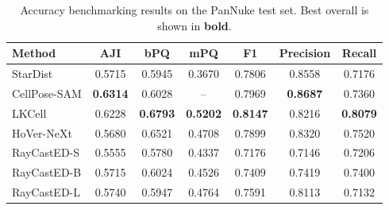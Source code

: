 \begin{table}[H]
	\centering
	\caption{Accuracy benchmarking results on the PanNuke test set. Best overall is shown in \textbf{bold}.}
	\label{tab:benchmark}
	\small
	\begin{tabular}{lcccccc}
		\hline
		\textbf{Method} & \textbf{AJI} & \textbf{bPQ} & \textbf{mPQ} & \textbf{F1} & \textbf{Precision} & \textbf{Recall} \\
		\hline
		StarDist      & 0.5715 & 0.5945 & 0.3670  & 0.7806 & 0.8558 & 0.7176 \\
		CellPose-SAM  & \textbf{0.6314} & 0.6028 & --     & 0.7969 & \textbf{0.8687} & 0.7360 \\
		LKCell        & 0.6228 & \textbf{0.6793} & \textbf{0.5202} & \textbf{0.8147} & 0.8216 & \textbf{0.8079} \\
		HoVer-NeXt    & 0.5680 & 0.6521 & 0.4708  & 0.7899 & 0.8320 & 0.7520 \\
		RayCastED-S   & 0.5555 & 0.5780 & 0.4337  & 0.7176 & 0.7146 & 0.7206 \\
		RayCastED-B   & 0.5715 & 0.6024 & 0.4526  & 0.7409 & 0.7419 & 0.7400 \\
		RayCastED-L   & 0.5740 & 0.5947 & 0.4764  & 0.7591 & 0.8113 & 0.7132 \\
		\hline
	\end{tabular}
\end{table}
